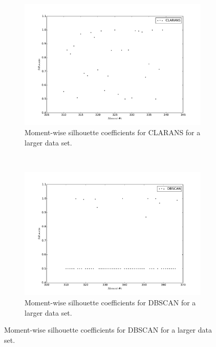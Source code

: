 \begin{figure}[h!]
    \centering
    \begin{subfigure}[b]{0.45\textwidth}
        \includegraphics[width=\textwidth]{plots/days_clarans_silhouette.pdf}
        \caption{Moment-wise silhouette coefficients for CLARANS for a larger 
        data set. }
        \label{fig:days-clarans-silhouette}
    \end{subfigure}%
    ~
    \begin{subfigure}[b]{0.45\textwidth}
        \includegraphics[width=\textwidth]{plots/days_dbscan_silhouette.pdf}
        \caption{Moment-wise silhouette coefficients for DBSCAN for a larger 
        data set. }
        \label{fig:days-dbscan-silhouette}
    \end{subfigure}
    

\end{figure}
